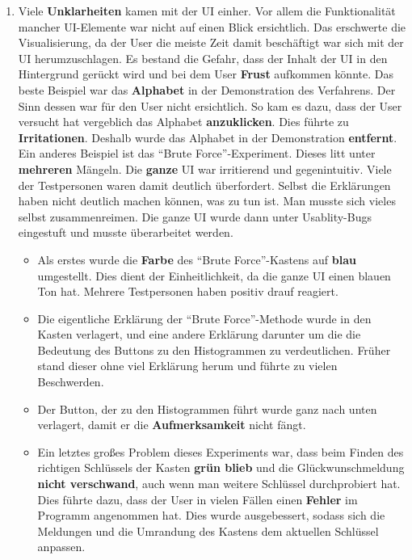 \documentclass{article}
\begin{document}
\begin{enumerate}
      \item Viele \textbf{Unklarheiten} kamen mit der UI einher. Vor allem die Funktionalität mancher UI-Elemente war nicht auf einen Blick ersichtlich.
            Das erschwerte die Visualisierung, da der User die meiste Zeit damit beschäftigt war sich mit der UI herumzuschlagen. Es bestand die Gefahr, dass
            der Inhalt der UI in den Hintergrund gerückt wird und bei dem User \textbf{Frust} aufkommen könnte.\newline
            Das beste Beispiel war das \textbf{Alphabet} in der Demonstration des Verfahrens. Der Sinn dessen war für den User nicht ersichtlich.
            So kam es dazu, dass der User versucht hat vergeblich das Alphabet \textbf{anzuklicken}. Dies führte zu \textbf{Irritationen}. Deshalb wurde das Alphabet 
            in der Demonstration \textbf{entfernt}.\newline
            Ein anderes Beispiel ist das ``Brute Force''-Experiment. Dieses litt unter \textbf{mehreren} Mängeln. Die \textbf{ganze} UI war irritierend und gegenintuitiv.
            Viele der Testpersonen waren damit deutlich überfordert. Selbst die Erklärungen haben nicht deutlich machen können, was zu tun ist. 
            Man musste sich vieles selbst zusammenreimen. Die ganze UI wurde dann unter Usablity-Bugs eingestuft und musste überarbeitet werden.
            \begin{itemize}
             \item Als erstes wurde die \textbf{Farbe} des ``Brute Force''-Kastens auf \textbf{blau} umgestellt. Dies dient der Einheitlichkeit, da die ganze UI einen blauen 
                   Ton hat. Mehrere Testpersonen haben positiv drauf reagiert.
             
             \item Die eigentliche Erklärung der ``Brute Force''-Methode wurde in den Kasten verlagert, und eine andere Erklärung darunter um die die Bedeutung
                   des Buttons zu den Histogrammen zu verdeutlichen. Früher stand dieser ohne viel Erklärung herum und führte zu vielen Beschwerden.
                   
             \item Der Button, der zu den Histogrammen führt wurde ganz nach unten verlagert, damit er die \textbf{Aufmerksamkeit} nicht fängt.
% 
             \item Ein letztes großes Problem dieses Experiments war, dass beim Finden des richtigen Schlüssels der Kasten \textbf{grün blieb} und die Glückwunschmeldung
                   \textbf{nicht verschwand}, auch wenn man weitere Schlüssel durchprobiert hat. Dies führte dazu, dass der User in vielen Fällen einen \textbf{Fehler} im Programm
                   angenommen hat. Dies wurde ausgebessert, sodass sich die Meldungen und die Umrandung des Kastens dem aktuellen Schlüssel anpassen.
            \end{itemize}
     \end{enumerate}
\end{document}
